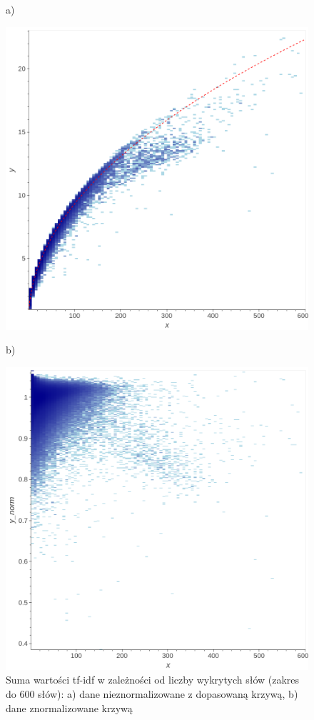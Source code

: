 		\begin{figure}[htb]
			\centering
			\begin{minipage}{.5\textwidth}
				a)\par\medskip %
				\includegraphics[width=\linewidth]{rys03/tfidf.png}
			\end{minipage}%
			\begin{minipage}{.5\textwidth}
				b)\par\medskip %
				\includegraphics[width=\linewidth]{rys03/tfidf_norm.png}
			\end{minipage}
			\caption{Suma wartości tf-idf w zależności od liczby wykrytych słów (zakres do 600 słów):
				a) dane nieznormalizowane z dopasowaną krzywą, b) dane znormalizowane krzywą}\label{fig:tfidf_sent} %
		\end{figure}


